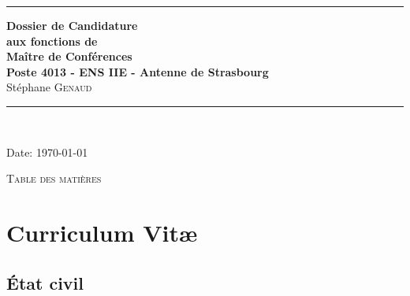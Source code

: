 \documentclass[11pt]{article}
\begin{document}
\thispagestyle{empty}




\rule{\linewidth}{1mm}
\begin{center}
\Large{\textbf{Dossier de Candidature\\
aux fonctions de \\
Maître de Conférences\\
Poste 4013 - ENS IIE - Antenne de Strasbourg}}\\[5mm]
\Large{Stéphane \textsc{Genaud}}\\[1cm]

\rule{\linewidth}{1mm}
\\
\vspace{3cm}
\end{center}
\begin{center}
Date: \today\\
\end{center}

\newpage
\mbox{}%

\setlength{\parindent}{5mm} %
\setlength{\parindent}{0mm}
\newpage


\begin{center}
\huge{\textsc{Table des matières}}
\end{center}
\vspace{2cm}


\tableofcontents

\noindent


\newpage



\section{Curriculum Vit{\ae}}

\setlength{\tabcolsep}{5pt}

\subsection{\'Etat civil}

\medskip
\end{document}
